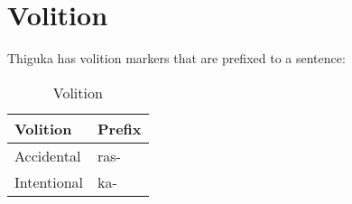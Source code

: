 \section{Volition}
Thiguka has volition markers that are prefixed to a sentence:

\begin{table}[H]
    \centering
    \caption{Volition}
    \begin{tabularx}{8cm}{|X|X|}
        \hline
        \textbf{Volition} & \textbf{Prefix} \\
        \hline
        Accidental & ras- \\
        Intentional & ka- \\
        \hline
    \end{tabularx}
\end{table}

